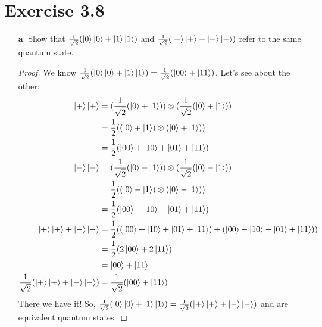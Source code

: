\documentclass[11pt]{article}
\def\haf{\frac{1}{2}}
\def\srtt{\ensuremath\frac{1}{\sqrt{2}}}
\begin{document}
\section*{Exercise 3.8}

\begin{itemize}
    \item[$\textbf{a.}$] Show that $\srtt(\ket{0}\ket{0} + \ket{1}\ket{1})$ 
        and $\srtt(\ket{+}\ket{+} + \ket{-}\ket{-})$ refer to the same 
        quantum state. 
    \begin{proof}
        We know $\srtt(\ket{0}\ket{0} + \ket{1}\ket{1}) = \srtt(\ket{00} + \ket{11})$.
        Let's see about the other:
        \begin{align*}
            \ket{+}\ket{+} &= (\srtt(\ket{0} + \ket{1})) \otimes
            (\srtt(\ket{0} + \ket{1}))
            \\
            &= \haf((\ket{0} + \ket{1}) \otimes (\ket{0} + \ket{1})) \\
            &= \haf(\ket{00} + \ket{10} + \ket{01} + \ket{11})\\ %
            \ket{-}\ket{-} &= (\srtt(\ket{0} - \ket{1})) \otimes (\srtt(\ket{0} - \ket{1})) \\
            &= \haf((\ket{0} - \ket{1})\otimes (\ket{0} - \ket{1})) \\
            &= \haf(\ket{00} - \ket{10} - \ket{01} + \ket{11}) \\ %
            \ket{+}\ket{+} + \ket{-}\ket{-}  &= \haf((\ket{00} + \ket{10} + \ket{01} + \ket{11}) + (\ket{00} - \ket{10} - \ket{01} + \ket{11}))  \\
            &= \haf(2\ket{00} + 2\ket{11}) \\
            &= \ket{00} + \ket{11} \\
            \srtt(\ket{+}\ket{+} + \ket{-}\ket{-}) &= \srtt(\ket{00} + \ket{11})
        \end{align*}
        There we have it! So, $\srtt(\ket{0}\ket{0} + \ket{1}\ket{1}) = \srtt(\ket{+}\ket{+} + \ket{-}\ket{-})$ and are equivalent quantum states.
    \end{proof}
    

\end{itemize}
\end{document}
